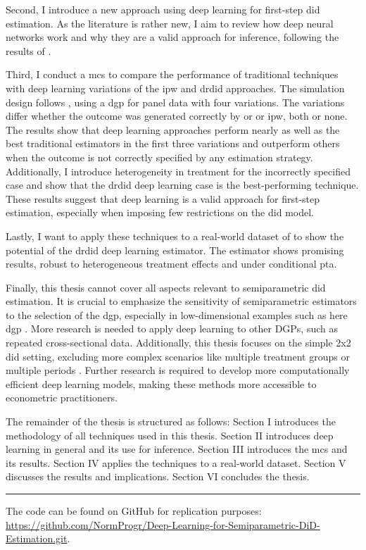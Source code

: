 Second, I introduce a new approach using deep learning for first-step \ac{did} estimation.
As the literature is rather new, I aim to review how deep neural networks work and why they are a valid approach for inference, following the results of \citet{farrellDeepNeuralNetworks2021}.

Third, I conduct a \ac{mcs} to compare the performance of traditional techniques with deep learning variations of the \ac{ipw} and \ac{drdid} approaches.
The simulation design follows \citet{santannaDoublyRobustDifferenceindifferences2020}, using a \ac{dgp} for panel data with four variations.
The variations differ whether the outcome was generated correctly by \ac{or} or \ac{ipw}, both or none.
The results show that deep learning approaches perform nearly as well as the best traditional estimators in the first three variations and outperform others when the outcome is not correctly specified by any estimation strategy.
Additionally, I introduce heterogeneity in treatment for the incorrectly specified case and show that the \ac{drdid} deep learning case is the best-performing technique.
These results suggest that deep learning is a valid approach for first-step estimation, especially when imposing few restrictions on the \ac{did} model.

Lastly, I want to apply these techniques to a real-world dataset of \citet{meyer1990workers} to show the potential of the \ac{drdid} deep learning estimator. %
The estimator shows promising results, robust to heterogeneous treatment effects and under conditional \ac{pta}.

Finally, this thesis cannot cover all aspects relevant to semiparametric \ac{did} estimation.
It is crucial to emphasize the sensitivity of semiparametric estimators to the selection of the \ac{dgp}, especially in low-dimensional examples such as here \ac{dgp} \citep{zimmert2018efficient}.
More research is needed to apply deep learning to other DGPs, such as repeated cross-sectional data.
Additionally, this thesis focuses on the simple 2x2 \ac{did} setting, excluding more complex scenarios like multiple treatment groups or multiple periods \citep[see][]{callawayDifferenceinDifferencesMultipleTime2021,goodman-baconDifferenceindifferencesVariationTreatment2021}.
Further research is required to develop more computationally efficient deep learning models, making these methods more accessible to econometric practitioners.

The remainder of the thesis is structured as follows: Section I introduces the methodology of all techniques used in this thesis.
Section II introduces deep learning in general and its use for inference.
Section III introduces the \ac{mcs} and its results.
Section IV applies the techniques to a real-world dataset.
Section V discusses the results and implications.
Section VI concludes the thesis.

\noindent\rule{3cm}{0.5pt} %

\small The code can be found on GitHub for replication purposes:
\url{https://github.com/NormProgr/Deep-Learning-for-Semiparametric-DiD-Estimation.git}.
